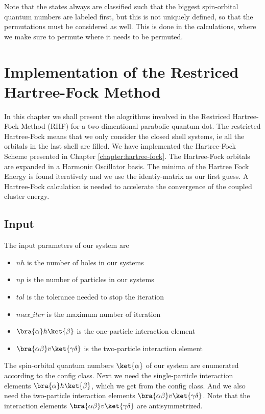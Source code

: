  Note that the states always are classified such that the biggest spin-orbital quantum numbers are labeled first, but this is not uniquely defined, so that the permutations must be considered as well. This is done in the calculations, where we make sure to permute where it needs to be permuted. 
 
 \section{Implementation of the Restriced Hartree-Fock Method}
In this chapter we shall present the alogrithms involved in the Restriced Hartree-Fock Method (RHF) for a two-dimentional parabolic quantum dot. The restricted Hartree-Fock means that we only consider the closed shell systems, ie all the orbitals in the last shell are filled. We have implemented the Hartree-Fock Scheme presented in Chapter \ref{chapter:hartree-fock}. The Hartree-Fock orbitals are expanded in a Harmonic Oscillator basis. The minima of the Hartree Fock Energy is found iteratively and we use the identiy-matrix as our first guess. A Hartree-Fock calculation is needed to accelerate the convergence of the coupled cluster energy. 
\\
\subsection{Input}
The input parameters of our system are
\begin{itemize}
  \item $nh$ is the number of holes in our systems
  \item $np$ is the number of particles in our systems
  \item $tol$ is the tolerance needed to stop the iteration
  \item $max\_iter$ is the maximum number of iteration
  \item $\bra{\alpha}h\ket{\beta}$ is the one-particle interaction element
  \item $\bra{\alpha\beta}v\ket{\gamma \delta}$ is the two-particle interaction element
\end{itemize}
%
The spin-orbital quantum numbers $\ket{\alpha}$ of our system are enumerated according to the config class. Next we need the single-particle interaction  elements $\bra{\alpha}h\ket{\beta}$, which we get from the config class. And we also need the two-particle interaction elements $\bra{\alpha\beta}v\ket{\gamma\delta}$. Note that the interaction elements $\bra{\alpha\beta}v\ket{\gamma\delta}$ are antisymmetrized.

